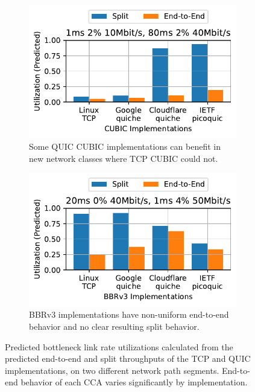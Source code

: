 \begin{figure}[t!]
    \centering
    \begin{subfigure}[b]{0.49\linewidth}
        \centering
        \includegraphics[width=\linewidth]
         {splitting-paper/figures/network_path_analysis/network_path_analysis_10_40_1_80_2_2.pdf}
        \captionsetup{skip=0pt}
        \caption{Some QUIC CUBIC implementations can benefit in new network
         classes where TCP CUBIC could not.}
        \label{fig:quic-predictions:cubic}
    \end{subfigure}
    \begin{subfigure}[b]{0.49\linewidth}
        \centering
        \includegraphics[width=\linewidth]
         {splitting-paper/figures/network_path_analysis/network_path_analysis_40_50_20_1_0_4.pdf}
        \captionsetup{skip=0pt}
        \caption{BBRv3 implementations have non-uniform end-to-end
         behavior and no clear resulting split behavior.}
        \label{fig:quic-predictions:bbr3}
    \end{subfigure}
    \caption{Predicted bottleneck link rate utilizations calculated from the
     predicted end-to-end and split throughputs of the TCP and QUIC
     implementations, on two different network path segments. End-to-end
     behavior of each CCA varies significantly by implementation.}
    \label{fig:quic-predictions}
\end{figure}
